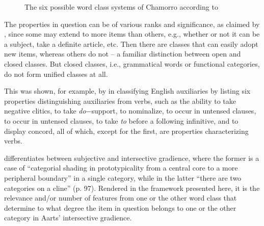 \documentclass[output=paper]{langsci/langscibook}
\begin{document}
\begin{figure}
\caption{The six possible word class systems of Chamorro according to
\textcite{Haspelmath2012}}\label{tab:27.2}
\end{figure}

The properties in question can be of various ranks and significance, as claimed
by \citet{Crystal1967}, since some may extend to more items than others, e.g.,
whether or not it can be a subject, take a definite article, etc. Then there
are classes that can easily adopt new items, whereas others do not – a familiar
distinction between open and closed classes. But closed classes, i.e.,
grammatical words or functional categories, do not form unified classes at all.

This was shown, for example, by \citet{Radford1976} in classifying English
auxiliaries by listing six properties distinguishing auxiliaries from verbs,
such as the ability to take negative clitics, to take \emph{do}−support, to
nominalize, to occur in untensed clauses, to occur in untensed clauses, to take
\emph{to} before a following infinitive, and to display concord, all of which,
except for the first, are properties characterizing verbs.

\citet{Aarts2007} differentiates between subjective and intersective gradience,\linebreak
where the former is a case of “categorial shading in prototypicality from a
central core to a more peripheral boundary” in a single category, while in the
latter “there are two categories on a cline” (p. 97). Rendered in the framework
presented here, it is the relevance and/or number of features from one or the
other word class that determine to what degree the item in question belongs
to one or the other category in Aarts’ intersective gradience.
\end{document}
